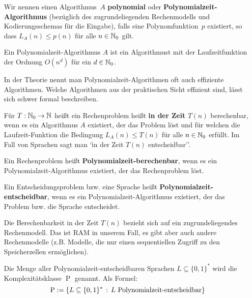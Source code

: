 \begin{defn} 
Wir nennen einen Algorithmus~$A$ \textbf{polynomial} oder \textbf{Polynomialzeit-Algorithmus} (bezüglich des zugrundeliegenden Rechenmodells und Kodierungsschemas für die Eingabe), falls eine Polynomfunktion~$p$ existiert, so dass $L_A(n) \leq p(n)$ für alle $n \in \mathbb{N}_0$ gilt.
\end{defn} 

\begin{bem}
	Ein Polynomialzeit-Algorithmus $A$ ist ein Algorithmust mit der Laufzeitfunktion der Ordnung $ O(n^d)$ für ein $d \in \mathbb{N}_0$. 
\end{bem} 

\begin{bem}
	In der Theorie nennt man Polynomialzeit-Algorithmen oft auch effiziente Algorithmen. Welche Algorithmen aus der praktischen Sicht effizient sind, lässt sich schwer formal beschreiben.
\end{bem} 

\begin{defn}
	Für $T: \mathbb{N}_0 \to \mathbb{N}$ heißt ein Rechenproblem heißt \textbf{in der Zeit $T(n)$} berechenbar, wenn es ein Algorithmus $A$ existiert, der das Problem löst und für welchen die Laufzeit-Funktion die Bedingung $L_A(n) \le T(n)$ für alle $n \in \mathbb{N}_0$ erfüllt. Im Fall von Sprachen sagt man `ìn der Zeit $T(n)$ entscheidbar''. 
	
	Ein Rechenproblem heißt \textbf{Polynomialzeit-berechenbar}, wenn es ein Po\-ly\-no\-mi\-al\-zeit-Algorithmus existiert, der das Rechenproblem löst. 
	
	Ein Entscheidungsproblem bzw. eine Sprache heißt \textbf{Polynomialzeit-\-ent\-scheid\-bar}, wenn es ein Polynomialzeit-Algorithmus existiert, der das Problem bzw. die Sprache entscheidet. 
\end{defn} 

\begin{bem}
	Die Berechenbarkeit in der Zeit $T(n)$ bezieht sich auf ein zugrundeliegendes Rechenmodell. Das ist RAM in unserem Fall, es gibt aber auch andere Rechenmodelle (z.B. Modelle, die nur einen sequentiellen Zugriff zu den Speicherzellen ermöglichen). 
\end{bem} 

\begin{defn}
	Die Menge aller Polynomialzeit-entscheidbaren Sprachen $L \subseteq \{0,1\}^\ast$ wird die Komplexitätsklasse $\operatorname{P}$ genannt. Als Formel: 
	\[
			\operatorname{P} := \left\{ L \subseteq \{0,1\}^\ast  \,:\, L \ \text{Polynomialzeit-entscheidbar}  \right\} 
	\]
\end{defn} 

